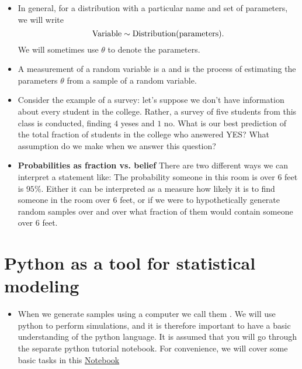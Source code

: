 \begin{itemize}
\begin{example}
\end{example}


\item  In general, for a distribution with a particular name and set of parameters, we will write 
\begin{equation*}
{\rm Variable} \sim {\rm Distribution}({\rm parameters}).
\end{equation*}
We will sometimes use $\theta$ to denote the parameters. 
\item A measurement of a random variable is a  and   is the process of estimating the parameters $\theta$ from a sample of a random variable. 
\item Consider the example of a survey: let's suppose we don't have information about every student in the college. Rather, a survey of five students from this class is conducted, finding $4$ yeses and $1$ no. What is our best prediction of the total fraction of students in the college who answered YES? What assumption do we make when we answer this question? 
\item {\bf Probabilities as fraction vs. belief}
There are two different ways we can interpret a statement like: The probability someone in this room is over $6$ feet is $95\%$. Either it can be interpreted as a measure how likely it is to find someone in the room over $6$ feet, or if we were to hypothetically generate random samples over and over what fraction of them would contain someone over $6$ feet. 
\end{itemize}





\section{Python as a tool for statistical modeling \cite[Sec. 2.3]{islp}}
\begin{itemize}
\item When we generate samples using a computer we call them . We will use python to perform simulations, and it is therefore important to have a basic understanding of the python language. It is assumed that you will go through the separate python tutorial notebook. For convenience, we will cover some basic tasks in this \href{https://colab.research.google.com/drive/1Gs-gSsUP1hHVwhrbwvWzLVm1ulcLJKRI#scrollTo=_c4br6SCUtUy}{Notebook}
\end{itemize}

